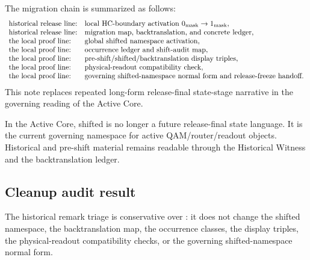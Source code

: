 \begin{definition}
\label{def:v401-compressed-shifted-genealogy-note}
The  migration chain is summarized as follows:
\[
\begin{array}{ll}
$\text{historical release line:}$  & \text{local HC-boundary activation }0_{\rm mask}\to1_{\rm mask},\\
\text{historical release line:} & \text{migration map, backtranslation, and concrete ledger},\\
\text{the local proof line:} & \text{global shifted namespace activation},\\
\text{the local proof line:} & \text{occurrence ledger and shift-audit map},\\
\text{the local proof line:} & \text{pre-shift/shifted/backtranslation display triples},\\
\text{the local proof line:} & \text{physical-readout compatibility check},\\
\text{the local proof line:} & \text{governing shifted-namespace normal form and release-freeze handoff}.
\end{array}
\]
This note replaces repeated long-form release-final state-stage narrative in the
governing reading of the Active Core.
\end{definition}

\begin{remark}
\label{rem:v401-current-governing-reading}
In the Active Core, shifted is no longer a future release-final state language. It is the
current governing namespace for active QAM/router/readout objects. Historical
and pre-shift material remains readable through the Historical Witness and the
backtranslation ledger.
\end{remark}

\subsection{Cleanup audit result}
\label{subsec:v401-cleanup-audit-result}

\begin{theorem}
\label{thm:v401-historical-remark-cleanup-conservativity}
The  historical remark triage is conservative over : it does not
change the shifted namespace, the backtranslation map, the occurrence classes,
the display triples, the physical-readout compatibility checks, or the
governing shifted-namespace normal form.
\end{theorem}

